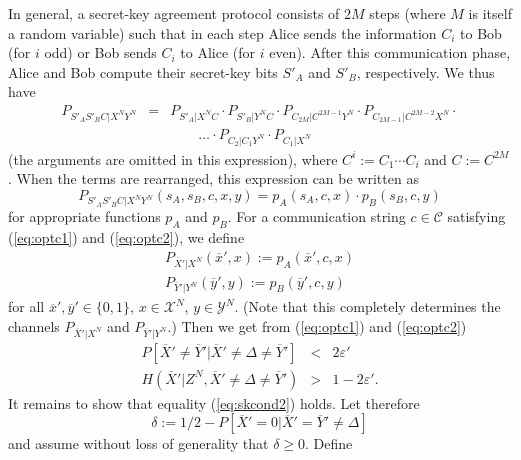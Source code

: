 \documentclass{article}
\begin{document}
  In general, a secret-key agreement protocol consists of $2M$ steps
  (where $M$ is itself a random variable) such that in each step Alice
  sends the information $C_i$ to Bob (for $i$ odd) or Bob sends $C_i$
  to Alice (for $i$ even). After this communication phase, Alice and
  Bob compute their secret-key bits $S'_A$ and $S'_B$, respectively. We
  thus have
  \begin{eqnarray*}
      P_{S'_AS'_BC|X^NY^N}
 &   = &
      P_{S'_A|X^N C} \cdot P_{S'_B|Y^N C} \cdot 
      P_{C_{2M}|C^{2M-1} Y^N} \cdot P_{C_{2M-1}|C^{2M-2} X^N}\cdot  \\
      && \qquad \ldots\cdot 
      P_{C_2|C_1 Y^N} \cdot P_{C_1|X^N}
  \end{eqnarray*}
  (the arguments are omitted in this expression), where $C^i := C_1
  \cdots C_i$ and $C := C^{2M}$. When the terms are rearranged, 
this expression
  can be written as
  \begin{equation}
      P_{S'_AS'_BC|X^NY^N}(s_A, s_B, c, x, y) 
    = 
      p_A(s_A, c, x) \cdot p_B(s_B, c, y) 
  \end{equation}
  for appropriate functions $p_A$ and $p_B$.  For a communication string $c \in
  \mathcal{C}$ satisfying (\ref{eq:optc1}) and (\ref{eq:optc2}), we define
  \begin{eqnarray}
    P_{\overline{X}'|X^N} (\overline{x}', x) := p_A(\overline{x}', c, x) \\
    P_{\overline{Y}'|Y^N} (\overline{y}', y) := p_B(\overline{y}', c, y)
  \end{eqnarray}
  for all $\overline{x}', \overline{y}' \in \{0, 1\}$, $x \in \mathcal{X}^N$,
  $y \in \mathcal{Y}^N$. (Note that this completely determines the
  channels $P_{\overline{X}'|X^N}$ and $P_{\overline{Y}'|Y^N}$.)  Then we get 
from 
  (\ref{eq:optc1}) and (\ref{eq:optc2})
  \begin{eqnarray} 
    P[\overline{X}' \neq \overline{Y}' | \overline{X}' \neq \Delta \neq \overline{Y}'] 
      & < & 2 \varepsilon' \label{eq:bitp1} \\
    H(\overline{X}' | Z^N, \overline{X}' \neq \Delta \neq \overline{Y}') 
      & > & 1-2\varepsilon' \label{eq:bitp2}.
  \end{eqnarray}
It remains to show that equality (\ref{eq:skcond2}) holds.  Let
  therefore 
  \begin{equation}
      \delta
    := 
      1/2 - P[\overline{X}' = 0|\overline{X}' = \overline{Y}' \neq \Delta]
  \end{equation}
  and assume without loss of generality that $\delta \geq 0$. Define
\end{document}
